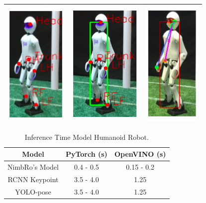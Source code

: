 \begin{longtable}{|c|c|c|}
  \includegraphics{gambar/nimbro-3.png} & \includegraphics{gambar/rcnn-3.png} & \includegraphics{gambar/yolo-3.png} \\
  \hline
\end{longtable}

\begin{longtable}{|c|c|c|}
  \caption{Inference Time Model Humanoid Robot.}
  \label{tb:inferencerobot}\\
  \hline
  \rowcolor[HTML]{C0C0C0}
  \textbf{Model}    & \textbf{PyTorch (s)} & \textbf{OpenVINO (s)}\\
  \hline
  NimbRo's Model & 0.4 - 0.5 & 0.15 - 0.2 \\
  \hline
  RCNN Keypoint   & 3.5 - 4.0 & 1.25 \\
  \hline
  YOLO-pose   & 3.5 - 4.0 & 1.25 \\
  \hline
\end{longtable}


